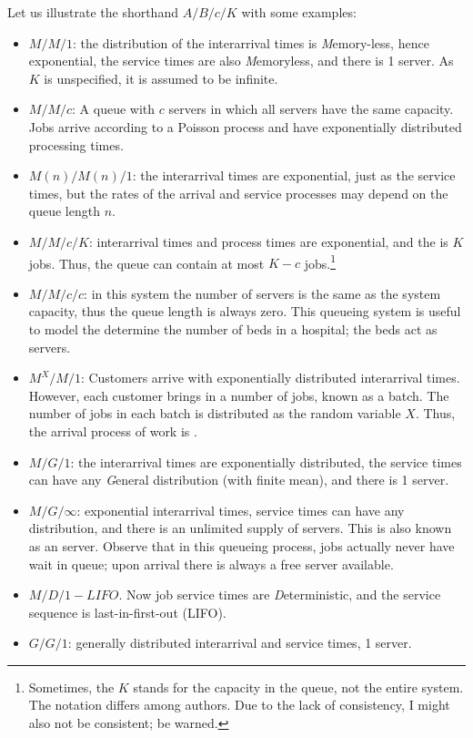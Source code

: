 Let us illustrate the shorthand $A/B/c/K$ with some examples:
\begin{itemize}
\item $M/M/1$: the distribution of the interarrival times is
  \emph{M}emory-less, hence exponential, the service times are also
  \emph{M}emoryless, and there is 1 server. As $K$ is unspecified, it
  is assumed to be infinite.
\item $M/M/c$: A  queue with $c$ servers in which
  all servers have the same capacity. Jobs arrive according to a
  Poisson process and have exponentially distributed processing times.
\item $M(n)/M(n)/1$: the interarrival times are exponential, just as
  the service times, but the rates of the arrival and service processes
  may depend on the queue length $n$. 
\item $M/M/c/K$: interarrival times and process times are exponential,
  and the  is $K$ jobs. Thus, the queue can
  contain at most $K-c$ jobs.\footnote{Sometimes, the $K$ stands for
    the capacity in the queue, not the entire system. The notation differs among
    authors. Due to the lack of consistency, I might also not be
    consistent; be warned.}
\item $M/M/c/c$: in this system the number of servers is the same as
  the system capacity, thus the queue length is always zero. This
  queueing system is useful to model the determine the number of beds
  in a hospital; the beds act as servers.
\item $M^X/M/1$: Customers arrive with exponentially distributed
  interarrival times. However, each customer brings in a number of
  jobs, known as a batch. The number of jobs in each batch is
  distributed as the random variable $X$. Thus, the arrival process of
  work is .
\item $M/G/1$: the interarrival times are exponentially distributed,
  the service times can have any \emph{G}eneral distribution (with
  finite mean), and there is 1 server.
\item $M/G/\infty$: exponential interarrival times, service times can
  have any distribution, and there is an unlimited supply of
  servers. This is also known as an  server. Observe
  that in this queueing process, jobs actually never have wait in
  queue; upon arrival there is always a free server available.
\item $M/D/1-LIFO$.  Now job service times are \emph{D}eterministic, and the service sequence is last-in-first-out (LIFO).
\item $G/G/1$: generally distributed interarrival and service times, 1 server.
\end{itemize}

